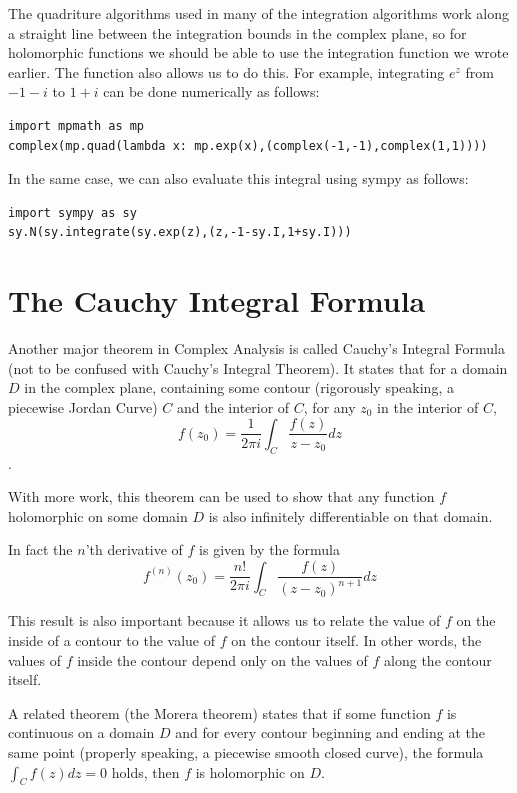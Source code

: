 The quadriture algorithms used in many of the integration algorithms work along a straight line between the integration bounds in the complex plane, so for holomorphic functions we should be able to use the integration function we wrote earlier. The  function also allows us to do this. For example, integrating $e^z$ from $-1-i$ to $1+i$ can be done numerically as follows:
\begin{lstlisting}[style=python]
import mpmath as mp
complex(mp.quad(lambda x: mp.exp(x),(complex(-1,-1),complex(1,1))))
\end{lstlisting}

In the same case, we can also evaluate this integral using sympy as follows:
\begin{lstlisting}[style=python]
import sympy as sy
sy.N(sy.integrate(sy.exp(z),(z,-1-sy.I,1+sy.I)))
\end{lstlisting}

\section*{The Cauchy Integral Formula}

Another major theorem in Complex Analysis is called Cauchy's Integral Formula (not to be confused with Cauchy's Integral Theorem). It states that for a domain $D$ in the complex plane, containing some contour (rigorously speaking, a piecewise Jordan Curve) $C$ and the interior of $C$, for any $z_0$ in the interior of $C$, 
$$f(z_0)=\frac{1}{2\pi i} \int_C \frac{f(z)}{z-z_0} dz$$. 

With more work, this theorem can be used to show that any function $f$ holomorphic on some domain $D$ is also infinitely differentiable on that domain.

In fact the $n$'th derivative of $f$ is given by the formula $$f^{(n)}(z_0) = \frac{n!}{2\pi i} \int_C \frac{f(z)}{(z-z_0)^{n+1}} dz$$

This result is also important because it allows us to relate the value of $f$ on the inside of a contour to the value of $f$ on the contour itself. In other words, the values of $f$ inside the contour depend only on the values of $f$ along the contour itself.

A related theorem (the Morera theorem) states that if some function $f$ is continuous on a domain $D$ and for every contour beginning and ending at the same point (properly speaking, a piecewise smooth closed curve), the formula $\int_C f(z) dz = 0$ holds, then $f$ is holomorphic on $D$. 

